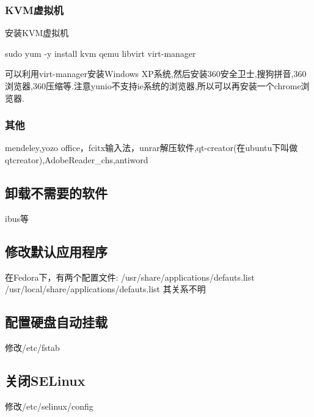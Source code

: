 \subsubsection{KVM虚拟机}
安装KVM虚拟机
\begin{shellcmd}
sudo yum -y install kvm qemu libvirt virt-manager
\end{shellcmd}
可以利用virt-manager安装Windows XP系统,然后安装360安全卫士,搜狗拼音,360浏览器,360压缩等.注意yunio不支持ie系统的浏览器,所以可以再安装一个chrome浏览器.

\subsubsection{其他}
mendeley,yozo office，fcitx输入法，unrar解压软件,qt-creator(在ubuntu下叫做qtcreator),AdobeReader\_chs,antiword

\subsection{卸载不需要的软件}
ibus等

\subsection{修改默认应用程序}
在Fedora下，有两个配置文件:
/usr/share/applications/defauts.list \\
/usr/local/share/applications/defauts.list
其关系不明

\subsection{配置硬盘自动挂载}
修改/etc/fstab

\subsection{关闭SELinux}
修改/etc/selinux/config



\newpage




